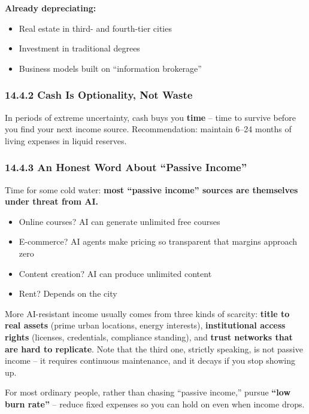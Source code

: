 \documentclass[11pt,a4paper]{article}
\begin{document}
\textbf{Already depreciating:}

\begin{itemize}
  \item Real estate in third- and fourth-tier cities
  \item Investment in traditional degrees
  \item Business models built on ``information brokerage''
\end{itemize}

\subsubsection{14.4.2 Cash Is Optionality, Not Waste}

In periods of extreme uncertainty, cash buys you \textbf{time} -- time to survive before you find your next income source. Recommendation: maintain 6--24 months of living expenses in liquid reserves.

\subsubsection{14.4.3 An Honest Word About ``Passive Income''}

Time for some cold water: \textbf{most ``passive income'' sources are themselves under threat from AI.}

\begin{itemize}
  \item Online courses? AI can generate unlimited free courses
  \item E-commerce? AI agents make pricing so transparent that margins approach zero
  \item Content creation? AI can produce unlimited content
  \item Rent? Depends on the city
\end{itemize}

More AI-resistant income usually comes from three kinds of scarcity: \textbf{title to real assets} (prime urban locations, energy interests), \textbf{institutional access rights} (licenses, credentials, compliance standing), and \textbf{trust networks that are hard to replicate}. Note that the third one, strictly speaking, is not passive income -- it requires continuous maintenance, and it decays if you stop showing up.

For most ordinary people, rather than chasing ``passive income,'' pursue \textbf{``low burn rate''} -- reduce fixed expenses so you can hold on even when income drops.
\end{document}
